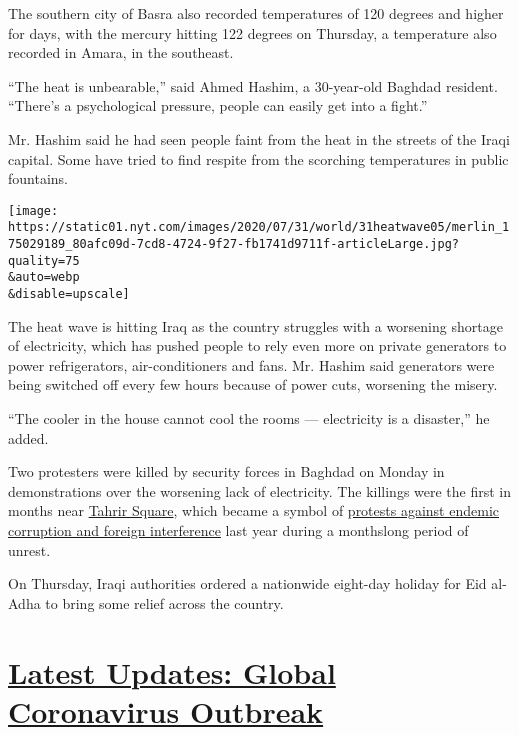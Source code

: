 The southern city of Basra also recorded temperatures of 120 degrees and
higher for days, with the mercury hitting 122 degrees on Thursday, a
temperature also recorded in Amara, in the southeast.

``The heat is unbearable,'' said Ahmed Hashim, a 30-year-old Baghdad
resident. ``There's a psychological pressure, people can easily get into
a fight.''

Mr. Hashim said he had seen people faint from the heat in the streets of
the Iraqi capital. Some have tried to find respite from the scorching
temperatures in public fountains.

\texttt{[image: https://static01.nyt.com/images/2020/07/31/world/31heatwave05/merlin\_175029189\_80afc09d-7cd8-4724-9f27-fb1741d9711f-articleLarge.jpg?quality=75\\\&auto=webp\\\&disable=upscale]}

The heat wave is hitting Iraq as the country struggles with a worsening
shortage of electricity, which has pushed people to rely even more on
private generators to power refrigerators, air-conditioners and fans.
Mr. Hashim said generators were being switched off every few hours
because of power cuts, worsening the misery.

``The cooler in the house cannot cool the rooms --- electricity is a
disaster,'' he added.

Two protesters were killed by security forces in Baghdad on Monday in
demonstrations over the worsening lack of electricity. The killings were
the first in months near
\href{https://www.nytimes.com/2019/11/20/world/middleeast/iraq-protests-sadr-city.html}{Tahrir
Square}, which became a symbol of
\href{https://www.nytimes.com/2019/12/21/world/middleeast/Iraq-protests-Iran.html}{protests
against endemic corruption and foreign interference} last year during a
monthslong period of unrest.

On Thursday, Iraqi authorities ordered a nationwide eight-day holiday
for Eid al-Adha to bring some relief across the country.

\hypertarget{latest-updates-global-coronavirus-outbreak}{%
\section{\texorpdfstring{\href{https://www.nytimes.com/2020/08/04/world/coronavirus-covid-19.html?action=click\&pgtype=Article\&state=default\&region=MAIN_CONTENT_1\&context=storylines_live_updates}{Latest
Updates: Global Coronavirus
Outbreak}}{Latest Updates: Global Coronavirus Outbreak}}\label{latest-updates-global-coronavirus-outbreak}}

